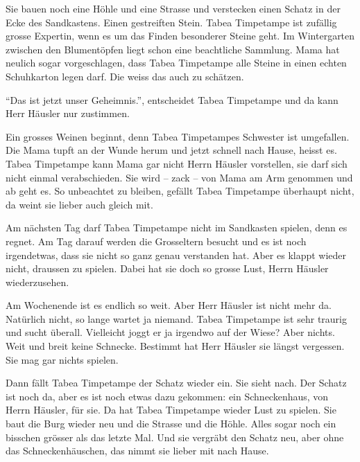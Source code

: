 Sie bauen noch eine Höhle und eine Strasse und verstecken einen Schatz in der Ecke des Sandkastens. Einen gestreiften Stein. Tabea Timpetampe ist zufällig grosse Expertin, wenn es um das Finden besonderer Steine geht. Im Wintergarten zwischen den Blumentöpfen liegt schon eine beachtliche Sammlung. Mama hat neulich sogar vorgeschlagen, dass Tabea Timpetampe alle Steine in einen echten Schuhkarton legen darf. Die weiss das auch zu schätzen.

\enquote{Das ist jetzt unser Geheimnis.}, entscheidet Tabea Timpetampe und da kann Herr Häusler nur zustimmen. 

Ein grosses Weinen beginnt, denn Tabea Timpetampes Schwester ist umgefallen. Die Mama tupft an der Wunde herum und jetzt schnell nach Hause, heisst es. Tabea Timpetampe kann Mama gar nicht Herrn Häusler vorstellen, sie darf sich nicht einmal verabschieden. Sie wird -- zack -- von Mama am Arm genommen und ab geht es. So unbeachtet zu bleiben, gefällt Tabea Timpetampe überhaupt nicht, da weint sie lieber auch gleich mit.

Am nächsten Tag darf Tabea Timpetampe nicht im Sandkasten spielen, denn es regnet. Am Tag darauf werden die Grosseltern besucht und es ist noch irgendetwas, dass sie nicht so ganz genau verstanden hat. Aber es klappt wieder nicht, draussen zu spielen. Dabei hat sie doch so grosse Lust, Herrn Häusler wiederzusehen. 

Am Wochenende ist es endlich so weit. Aber Herr Häusler ist nicht mehr da. Natürlich nicht, so lange wartet ja niemand. Tabea Timpetampe ist sehr traurig und sucht überall. Vielleicht joggt er ja irgendwo auf der Wiese? Aber nichts. Weit und breit keine Schnecke. Bestimmt hat Herr Häusler sie längst vergessen. Sie mag gar nichts spielen.

Dann fällt Tabea Timpetampe der Schatz wieder ein. Sie sieht nach. Der Schatz ist noch da, aber es ist noch etwas dazu gekommen: ein Schneckenhaus, von Herrn Häusler, für sie. Da hat Tabea Timpetampe wieder Lust zu spielen. Sie baut die Burg wieder neu und die Strasse und die Höhle. Alles sogar noch ein bisschen grösser als das letzte Mal. Und sie vergräbt den Schatz neu, aber ohne das Schneckenhäuschen, das nimmt sie lieber mit nach Hause. \hfill {\color{red}\decofourleft}
